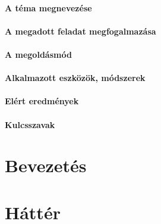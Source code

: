 \documentclass[12pt]{report}
\theoremstyle{definition}
\begin{document}

    \subsubsection*{A téma megnevezése}

    \subsubsection*{A megadott feladat megfogalmazása}

    \subsubsection*{A megoldásmód}

    \subsubsection*{Alkalmazott eszközök, módszerek}

    \subsubsection*{Elért eredmények}

    \subsubsection*{Kulcsszavak}



    \chapter*{Bevezetés}
    \label{Bevezetés}



    \chapter{Háttér}
    \label{Háttér}
\end{document}
